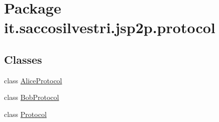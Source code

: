 \hypertarget{namespaceit_1_1saccosilvestri_1_1jsp2p_1_1protocol}{
\section{\-Package it.saccosilvestri.jsp2p.protocol}
\label{namespaceit_1_1saccosilvestri_1_1jsp2p_1_1protocol}
}
\subsection*{\-Classes}
\begin{DoxyCompactItemize}
\item 
class \hyperlink{classit_1_1saccosilvestri_1_1jsp2p_1_1protocol_1_1_alice_protocol}{\-Alice\-Protocol}
\item 
class \hyperlink{classit_1_1saccosilvestri_1_1jsp2p_1_1protocol_1_1_bob_protocol}{\-Bob\-Protocol}
\item 
class \hyperlink{classit_1_1saccosilvestri_1_1jsp2p_1_1protocol_1_1_protocol}{\-Protocol}
\end{DoxyCompactItemize}
